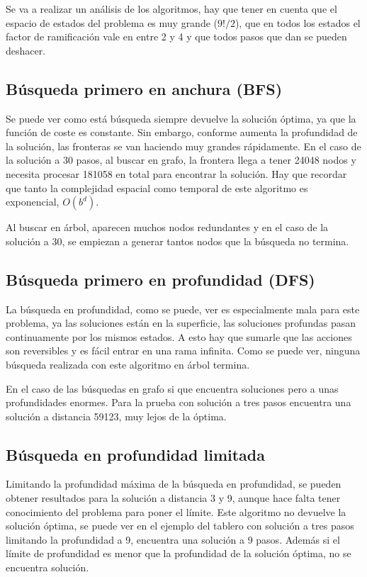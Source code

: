 \documentclass{article}
\begin{document}
Se va a realizar un análisis de los algoritmos, hay que tener en cuenta que el espacio de estados del problema es muy grande ($9!/2$), que en todos los estados el factor de ramificación vale en entre 2 y 4 y que todos pasos que dan se pueden deshacer.

\subsection{Búsqueda primero en anchura (BFS)}
Se puede ver como está búsqueda siempre devuelve la solución óptima, ya que la función de coste es constante. Sin embargo, conforme aumenta la profundidad de la solución, las fronteras se van haciendo muy grandes rápidamente. En el caso de la solución a 30 pasos, al buscar en grafo, la frontera llega a tener 24048 nodos y necesita procesar 181058 en total para encontrar la solución. Hay que recordar que tanto la complejidad espacial como temporal de este algoritmo es exponencial, $O(b^d)$.

Al buscar en árbol, aparecen muchos nodos redundantes y en el caso de la solución a 30, se empiezan a generar tantos nodos que la búsqueda no termina.

\subsection{Búsqueda primero en profundidad (DFS)}
La búsqueda en profundidad, como se puede, ver es especialmente mala para este problema, ya las soluciones están en la superficie, las soluciones profundas pasan continuamente por los mismos estados. A esto hay que sumarle que las acciones son reversibles y es fácil entrar en una rama infinita. Como se puede ver, ninguna búsqueda realizada con este algoritmo en árbol termina. 

En el caso de las búsquedas en grafo si que encuentra soluciones pero a unas profundidades enormes. Para la prueba con solución a tres pasos encuentra una solución a distancia 59123, muy lejos de la óptima.

\subsection{Búsqueda en profundidad limitada}
Limitando la profundidad máxima de la búsqueda en profundidad, se pueden obtener resultados para la solución a distancia 3 y 9, aunque hace falta tener conocimiento del problema para poner el límite. Este algoritmo no devuelve la solución óptima, se puede ver en el ejemplo del tablero con solución a tres pasos limitando la profundidad a 9, encuentra una solución a 9 pasos. Además si el límite de profundidad es menor que la profundidad de la solución óptima, no se encuentra solución.
\end{document}
